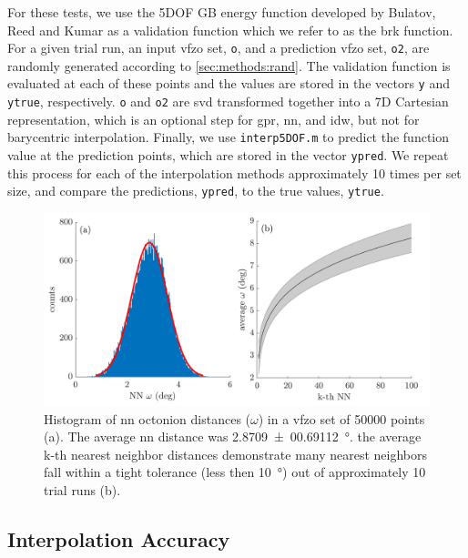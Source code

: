 \documentclass[final,twocolumn,12pt]{elsarticle}
\newcommand{\inpt}{input}
\newcommand{\outpt}{prediction}
\newcommand{\nnomega}{2.8709 \pm 00.69112}
\begin{document}
{For these tests, we use the 5DOF GB energy function developed by Bulatov, Reed and Kumar \cite{bulatovGrainBoundaryEnergy2014} as a validation function which we refer to as the \gls{brk} function. For a given trial run, an \inpt{} \gls{vfzo} set, \texttt{o}, and a \outpt{} \gls{vfzo} set, \texttt{o2}, are randomly generated according to \cref{sec:methods:rand}. The validation function is evaluated at each of these points and the values are stored in the vectors \texttt{y} and \texttt{ytrue}, respectively. \texttt{o} and \texttt{o2} are \gls{svd} transformed together into a 7D Cartesian representation, which is an optional step for \gls{gpr}, \gls{nn}, and \gls{idw}, but not for barycentric interpolation. Finally, we use \texttt{interp5DOF.m} \cite{bairdFiveDegreeofFreedom5DOF2020} to predict the function value at the \outpt{} points, which are stored in the vector \texttt{ypred}. We repeat this process for each of the interpolation methods approximately 10 times per set size, and compare the predictions, \texttt{ypred}, to the true values, \texttt{ytrue}.

\begin{figure}
\centering
\includegraphics[scale=1]{nnhist-knn-50000.png}
\caption{Histogram of \gls{nn} octonion distances ($\omega$) in a \gls{vfzo} set of \num{50000} points (a). The average \gls{nn} distance was \SI{\nnomega}{\degree}. the average k-th nearest neighbor distances demonstrate many nearest neighbors fall within a tight tolerance (less then \SI{10}{\degree}) out of approximately 10 trial runs (b).}
\label{fig:nnhist-knn-50000}
\end{figure}

\subsection{Interpolation Accuracy}
\label{sec:results:accuracy}

}
\end{document}
